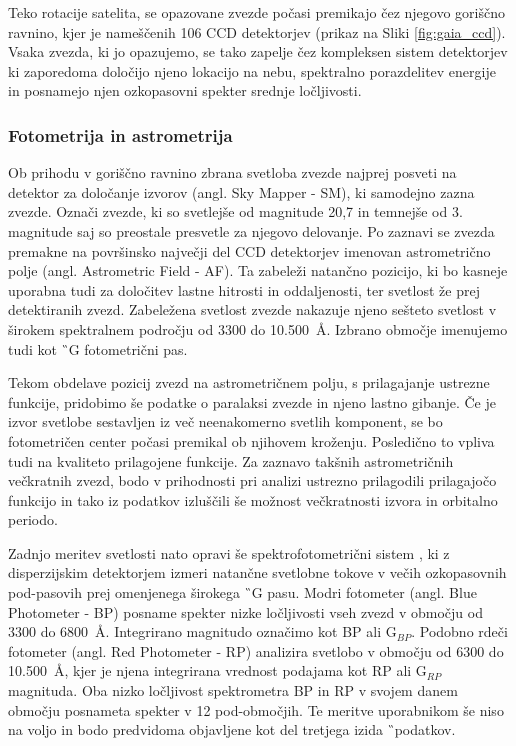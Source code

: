 Teko rotacije satelita, se opazovane zvezde počasi premikajo čez njegovo goriščno ravnino, kjer je nameščenih 106 CCD detektorjev (prikaz na Sliki \ref{fig:gaia_ccd}). Vsaka zvezda, ki jo opazujemo, se tako zapelje čez kompleksen sistem detektorjev ki zaporedoma določijo njeno lokacijo na nebu, spektralno porazdelitev energije in posnamejo njen ozkopasovni spekter srednje ločljivosti.

\subsubsection{Fotometrija in astrometrija}
Ob prihodu v goriščno ravnino zbrana svetloba zvezde najprej posveti na detektor za določanje izvorov (angl. Sky Mapper - SM), ki samodejno zazna zvezde. Označi zvezde, ki so svetlejše od magnitude 20,7 in temnejše od 3. magnitude saj so preostale presvetle za njegovo delovanje. Po zaznavi se zvezda premakne na površinsko največji del CCD detektorjev imenovan astrometrično polje (angl. Astrometric Field - AF). Ta zabeleži natančno pozicijo, ki bo kasneje uporabna tudi za določitev lastne hitrosti in oddaljenosti, ter svetlost že prej detektiranih zvezd. Zabeležena svetlost zvezde nakazuje njeno sešteto svetlost v širokem spektralnem področju od 3300 do 10.500~\AA. Izbrano območje imenujemo tudi kot \G\ G fotometrični pas.

Tekom obdelave pozicij zvezd na astrometričnem polju, s prilagajanje ustrezne funkcije, pridobimo še podatke o paralaksi zvezde in njeno lastno gibanje. Če je izvor svetlobe sestavljen iz več neenakomerno svetlih komponent, se bo fotometričen center počasi premikal ob njihovem kroženju. Posledično to vpliva tudi na kvaliteto prilagojene funkcije. Za zaznavo takšnih astrometričnih večkratnih zvezd, bodo v prihodnosti pri analizi ustrezno prilagodili prilagajočo funkcijo in tako iz podatkov izluščili še možnost večkratnosti izvora in orbitalno periodo.

Zadnjo meritev svetlosti nato opravi še spektrofotometrični sistem \cite{2018arXiv180409368E}, ki z disperzijskim detektorjem izmeri natančne svetlobne tokove v večih ozkopasovnih pod-pasovih prej omenjenega širokega \G\ G pasu. Modri fotometer (angl. Blue Photometer - BP) posname spekter nizke ločljivosti vseh zvezd v območju od 3300 do 6800~\AA. Integrirano magnitudo označimo kot BP ali G$_{BP}$. Podobno rdeči fotometer (angl. Red Photometer - RP) analizira svetlobo v območju od 6300 do 10.500~\AA, kjer je njena integrirana vrednost podajama kot RP ali G$_{RP}$ magnituda. Oba nizko ločljivost spektrometra BP in RP v svojem danem območju posnameta spekter v 12 pod-območjih. Te meritve uporabnikom še niso na voljo in bodo predvidoma objavljene kot del tretjega izida \G\ podatkov.

